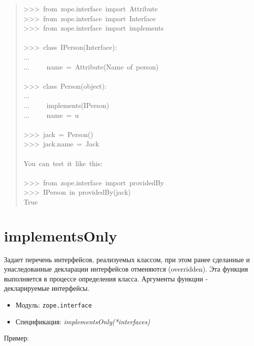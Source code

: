 \documentclass[14pt,a4paper,openany,twoside,final]{extbook}
\providecommand*{\DUroletitlereference}[1]{\textsl{#1}}
\begin{document}
\begin{quote}{\ttfamily \raggedright \noindent
>{}>{}>~from~zope.interface~import~Attribute\\
>{}>{}>~from~zope.interface~import~Interface\\
>{}>{}>~from~zope.interface~import~implements\\
~\\
>{}>{}>~class~IPerson(Interface):\\
...\\
...~~~~~name~=~Attribute(\textquotedbl{}Name~of~person\textquotedbl{})\\
~\\
>{}>{}>~class~Person(object):\\
...\\
...~~~~~implements(IPerson)\\
...~~~~~name~=~u\textquotedbl{}\textquotedbl{}\\
~\\
>{}>{}>~jack~=~Person()\\
>{}>{}>~jack.name~=~\textquotedbl{}Jack\textquotedbl{}\\
~\\
You~can~test~it~like~this:\\
~\\
>{}>{}>~from~zope.interface~import~providedBy\\
>{}>{}>~IPerson~in~providedBy(jack)\\
True
}
\end{quote}


\section*{implementsOnly%
  \label{implementsonly}%
}

Задает перечень интерфейсов, реализуемых классом, при этом ранее
сделанные и унаследованные декларации интерфейсов отменяются
(overridden).  Эта функция выполняется в процессе определения класса.
Аргументы функции - декларируемые интерфейсы.

\begin{itemize}

\item Модуль: \texttt{zope.interface}

\item Спецификация: \DUroletitlereference{implementsOnly(*interfaces)}

\end{itemize}

Пример:
\end{document}
